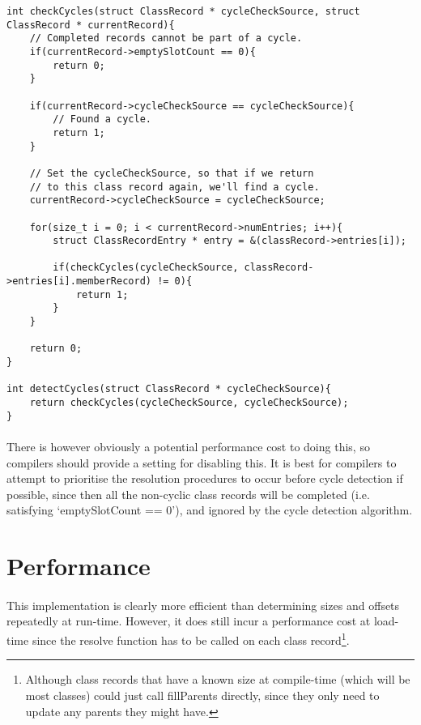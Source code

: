 \documentclass{article}
\begin{document}
\begin{lstlisting}
int checkCycles(struct ClassRecord * cycleCheckSource, struct ClassRecord * currentRecord){
	// Completed records cannot be part of a cycle.
	if(currentRecord->emptySlotCount == 0){
		return 0;
	}
	
	if(currentRecord->cycleCheckSource == cycleCheckSource){
		// Found a cycle.
		return 1;
	}
	
	// Set the cycleCheckSource, so that if we return
	// to this class record again, we'll find a cycle.
	currentRecord->cycleCheckSource = cycleCheckSource;

	for(size_t i = 0; i < currentRecord->numEntries; i++){
		struct ClassRecordEntry * entry = &(classRecord->entries[i]);
		
		if(checkCycles(cycleCheckSource, classRecord->entries[i].memberRecord) != 0){
			return 1;
		}
	}
	
	return 0;
}

int detectCycles(struct ClassRecord * cycleCheckSource){
	return checkCycles(cycleCheckSource, cycleCheckSource);
}
\end{lstlisting}

\paragraph{}
There is however obviously a potential performance cost to doing this, so compilers should provide a setting for disabling this. It is best for compilers to attempt to prioritise the resolution procedures to occur before cycle detection if possible, since then all the non-cyclic class records will be completed (i.e. satisfying `emptySlotCount == 0'), and ignored by the cycle detection algorithm.

\section{Performance}

\paragraph{}
This implementation is clearly more efficient than determining sizes and offsets repeatedly at run-time. However, it does still incur a performance cost at load-time since the resolve function has to be called on each class record\footnote{Although class records that have a known size at compile-time (which will be most classes) could just call fillParents directly, since they only need to update any parents they might have.}.
\end{document}
